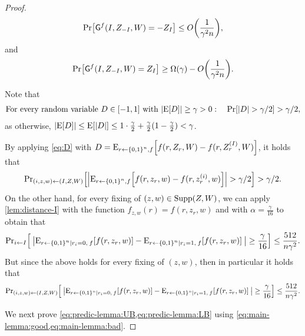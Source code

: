 {\begin{proof}
	\begin{align}\label{eq:predic-lemma:UB}
		\pr{\Gc^f(I,Z_{-I}, W) = -Z_I} \leq O\paren{\frac{1}{\gamma^2 n}},
	\end{align}
	and 
	\begin{align}\label{eq:predic-lemma:LB}
		\pr{\Gc^f(I,Z_{-I}, W) = Z_I} \geq \Omega(\gamma) - O\paren{\frac{1}{\gamma^2 n}}.
	\end{align}

	Note that
	\begin{align}\label{eq:D}
		\text{For every random variable }D \in [-1,1]\text{ with }\size{\ex{D}} \geq \gamma >0: \quad \pr{\size{D} > \gamma/2} > \gamma/2,
	\end{align}
	as otherwise, $\size{\ex{D}} \leq \ex{\size{D}} \leq 1\cdot \frac{\gamma}{2} + \frac{\gamma}{2}(1-\frac{\gamma}{2}) < \gamma$.
	
	
	By applying \cref{eq:D} with $D = \eex{r \la \zo^n, f}{f(r,Z_{r},W) - f(r,Z^{(I)}_{r},W)}$, it holds that
	\begin{align}\label{eq:main-lemma:good}
		\ppr{(i,z,w) \la (I,Z,W)}{\size{\eex{r \la \zo^n, f}{f(r,z_{r},w) - f(r,z^{(i)}_{r},w)}} > \gamma/2} > \gamma/2.
	\end{align}
	On the other hand, for every fixing of $(z,w) \in \operatorname{Supp}(Z,W)$, we can apply \cref{lem:distance-I} with the function $f_{z,w}(r) = f(r,z_{r},w)$ and with $\alpha =\frac{\gamma}{16}$ to obtain that
	\begin{align*}
		\ppr{i\la I}{\: \size{\eex{r \la \zo^n \mid r_i = 0, \: f}{f(r,z_{r},w)} - \eex{r \la \zo^n \mid r_i = 1, \: f}{f(r,z_{r},w)} \:} \geq \frac{\gamma}{16}} \leq \frac{512}{n \gamma^2}.
	\end{align*}
	But since the above holds for every fixing of $(z,w)$, then in particular it holds that
	\begin{align}\label{eq:main-lemma:bad}
		\ppr{(i,z,w) \la (I,Z,W)}{\: \size{\eex{r \la \zo^n \mid r_i = 0, \: f}{f(r,z_{r},w)} - \eex{r \la \zo^n \mid r_i = 1, \: f}{f(r,z_{r},w)} \:} \geq \frac{\gamma}{16}} \leq \frac{512}{n \gamma^2}.
	\end{align}
	
	We next prove \cref{eq:predic-lemma:UB,eq:predic-lemma:LB} using \cref{eq:main-lemma:good,eq:main-lemma:bad}.
	

\end{proof}}
